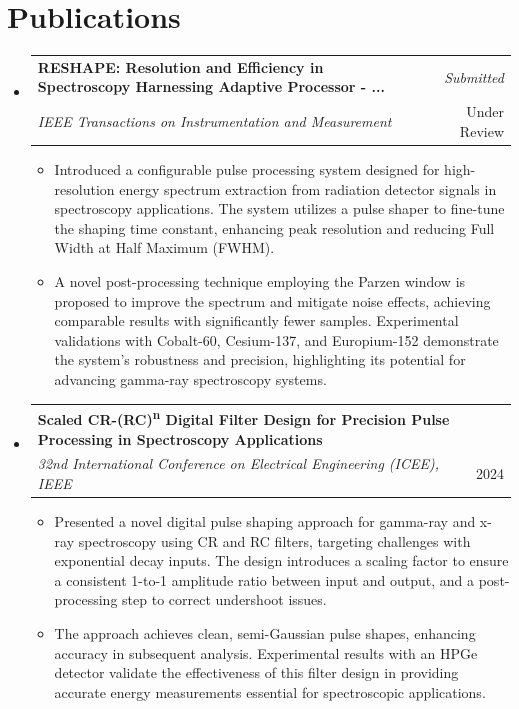 \documentclass[a4paper,11pt]{article}
\makeatletter
\newcommand{\resumeSubheading}[4]{
\vspace{0.5mm}\item
    \begin{tabular*}{0.98\textwidth}[t]{l@{\extracolsep{\fill}}r}
        \textbf{#1} & \textit{\footnotesize{#4}} \\
        \textit{\footnotesize{#3}} &  \footnotesize{#2}\\
    \end{tabular*}
    \vspace{-2.4mm}
}
\newcommand{\resumeSubHeadingListStart}{\begin{itemize}[leftmargin=*,labelsep=0mm]}
\newcommand{\resumeItemListStart}{\begin{justify}\begin{itemize}[leftmargin=3ex, rightmargin=2ex, noitemsep,labelsep=1.2mm,itemsep=0mm]\small}
\newcommand{\resumeSubHeadingListEnd}{\end{itemize}\vspace{2mm}}
\newcommand{\resumeItemListEnd}{\end{itemize}\end{justify}\vspace{-2mm}}
\makeatother
\begin{document}
\section{\textbf{Publications}}
  \resumeSubHeadingListStart

    \resumeSubheading
    {RESHAPE: Resolution and Efficiency in Spectroscopy Harnessing Adaptive Processor - ... }{Under Review}
    {IEEE Transactions on Instrumentation and Measurement}{Submitted}
    \resumeItemListStart
      \item{Introduced a configurable pulse processing system designed for high-resolution energy spectrum extraction from radiation detector signals in spectroscopy applications. The system utilizes a pulse shaper to fine-tune the shaping time constant, enhancing peak resolution and reducing Full Width at Half Maximum (FWHM).}
      \item{A novel post-processing technique employing the Parzen window is proposed to improve the spectrum and mitigate noise effects, achieving comparable results with significantly fewer samples. Experimental validations with Cobalt-60, Cesium-137, and Europium-152 demonstrate the system's robustness and precision, highlighting its potential for advancing gamma-ray spectroscopy systems.}
    \resumeItemListEnd
    \vspace{-2mm}

    \resumeSubheading
      {Scaled CR-(RC)\textsuperscript{n} Digital Filter Design for Precision Pulse Processing in Spectroscopy Applications}{2024}
      {32nd International Conference on Electrical Engineering (ICEE), IEEE}{}
      \resumeItemListStart
        \item{Presented a novel digital pulse shaping approach for gamma-ray and x-ray spectroscopy using CR and RC filters, targeting challenges with exponential decay inputs. The design introduces a scaling factor to ensure a consistent 1-to-1 amplitude ratio between input and output, and a post-processing step to correct undershoot issues.}
        \item{The approach achieves clean, semi-Gaussian pulse shapes, enhancing accuracy in subsequent analysis. Experimental results with an HPGe detector validate the effectiveness of this filter design in providing accurate energy measurements essential for spectroscopic applications.}
      \resumeItemListEnd
      \vspace{-2mm}
  \resumeSubHeadingListEnd
\end{document}
